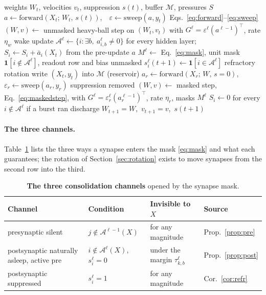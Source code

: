 \documentclass{article}
\begin{document}
\begin{algorithm}[h]
\caption{One waking step of the default system (rotation always on, one burst per batch).}
\label{alg:step}
\begin{algorithmic}[1]
\REQUIRE weights $W_t$, velocities $v_t$, suppression $s(t)$, buffer $\mathcal{M}$, pressures $S$
\STATE $a\leftarrow\mathrm{forward}(X_t;\,W_t,\,s(t))$,\ \ $\varepsilon\leftarrow\mathrm{sweep}(a,y_t)$ \hfill Eqs.~\eqref{eq:forward}--\eqref{eq:sweep}
\STATE $(W,v)\leftarrow$ unmasked heavy-ball step on $(W_t,v_t)$ with $G^\ell=\varepsilon^\ell(a^{\ell-1})^{\!\top}$, rate $\eta_w$ \hfill wake update
\STATE $\mathcal{A}^\ell\leftarrow\{i:\exists b,\ a^\ell_{i,b}\neq0\}$ for every hidden layer;\ \ $S_i\leftarrow S_i+\bar a_i(X_t)$ \hfill from the pre-update $a$
\STATE $M^\ell\leftarrow$ Eq.~\eqref{eq:mask}, unit mask $\mathbf{1}[i\notin\mathcal{A}^\ell]$, readout row and bias unmasked
\STATE $s^\ell_i(t{+}1)\leftarrow\mathbf{1}[i\in\mathcal{A}^\ell]$ \hfill refractory rotation
\STATE write $(X_t,y_t)$ into $\mathcal{M}$ (reservoir)
\STATE $a_r\leftarrow\mathrm{forward}(X_r;\,W,\,s{=}0)$,\ \ $\varepsilon_r\leftarrow\mathrm{sweep}(a_r,y_r)$ \hfill suppression removed
\STATE $(W,v)\leftarrow$ masked step, Eq.~\eqref{eq:maskedstep}, with $G^\ell=\varepsilon^\ell_r(a^{\ell-1}_r)^{\!\top}$, rate $\eta_r$, masks $M^\ell$
\ENDFOR
\STATE $S_i\leftarrow0$ for every $i\notin\mathcal{A}^\ell$ if a burst ran \hfill discharge
\RETURN $W_{t+1}=W$,\ $v_{t+1}=v$,\ $s(t{+}1)$
\end{algorithmic}
\end{algorithm}

\paragraph{The three channels.} Table~\ref{tab:channels} lists the three ways a synapse
enters the mask \eqref{eq:mask} and what each guarantees; the rotation of
Section~\ref{sec:rotation} exists to move synapses from the second row into the third.

\begin{table}[h]
\centering\small
\begin{tabular}{llll}
\toprule
Channel & Condition & Invisible to $X$ & Source \\
\midrule
presynaptic silent & $j\notin\mathcal{A}^{\ell-1}(X)$ & for any magnitude & Prop.~\ref{prop:pre} \\
postsynaptic naturally asleep, active pre & $i\notin\mathcal{A}^{\ell}(X)$, $s^\ell_i=0$ & under the margin $\tau^\ell_{k,b}$ & Prop.~\ref{prop:post} \\
postsynaptic suppressed & $s^\ell_i=1$ & for any magnitude & Cor.~\ref{cor:refr} \\
\bottomrule
\end{tabular}
\caption{\textbf{The three consolidation channels} opened by the synapse mask.}
\label{tab:channels}
\end{table}
\end{document}
